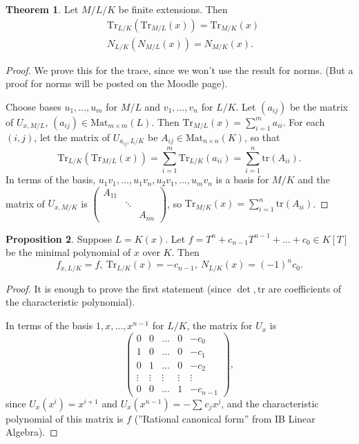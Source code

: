 \documentclass{article}
\theoremstyle{definition}
\newtheorem{theorem}{Theorem}[section]
\newtheorem{prop}[theorem]{Proposition}
\begin{document}
\begin{theorem}\label{13.2}
    Let $M/L/K$ be finite extensions. Then 
    \begin{align*}
        &\text{Tr}_{L/K}(\text{Tr}_{M/L}(x)) = \text{Tr}_{M/K}(x) \\
        &N_{L/K}(N_{M/L}(x)) = N_{M/K}(x).
    \end{align*}
\end{theorem}
\begin{proof}
    We prove this for the trace, since we won't use the result for norms. (But a proof for norms will be posted on the Moodle page).
    \vspace{1mm}
    
    Choose bases $u_1,\ldots,u_m$ for $M/L$ and $v_1,\ldots, v_n$ for $L/K$. Let $(a_{ij})$ be the matrix of $U_{x,M/L}$, $(a_{ij}) \in \text{Mat}_{m \times m}(L)$. Then $\text{Tr}_{M/L}(x)=\sum_{i=1}^{m} a_{ii}$. For each $(i,j)$, let the matrix of $U_{a_{ij},L/K}$ be $A_{ij} \in \text{Mat}_{n \times n}(K)$, so that $$\text{Tr}_{L/K}(\text{Tr}_{M/L}(x)) = \sum_{i=1}^{m} \text{Tr}_{L/K}(a_{ii}) = \sum_{i=1}^{n} \text{tr}(A_{ii}).$$
    In terms of the basis, $u_1v_1,\ldots,u_1v_n,u_2v_1,\ldots,u_mv_n$ is a basis for $M/K$ and the matrix of $U_{x,M/K}$ is $\begin{pmatrix} A_{11} & &\\ & \ddots & \\ & & A_{nn} \end{pmatrix}$, so $\text{Tr}_{M/K}(x)=\sum_{i=1}^{n} \text{tr}(A_{ii})$.
\end{proof}
\begin{prop}\label{13.3}
    Suppose $L=K(x)$. Let ${f = T^n + c_{n-1}T^{n-1} + \ldots + c_0 \in K[T]}$ be the minimal polynomial of $x$ over $K$. Then \[
    f_{x,L/K}=f,~ \text{Tr}_{L/K}(x)=-c_{n-1},~ N_{L/K}(x)=(-1)^nc_0.
    \]
\end{prop}
\begin{proof}
    It is enough to prove the first statement (since $\det, \text{tr}$ are coefficients of the characteristic polynomial).

    In terms of the basis $1,x,\ldots,x^{n-1}$ for $L/K$, the matrix for $U_x$ is \[
    \begin{pmatrix}
    0 & 0 & \ldots & 0 &-c_0\\
    1 & 0 & \ldots & 0 &-c_1\\
    0 & 1 & \ldots & 0 & -c_2 \\
    \vdots & \vdots & \vdots & \vdots & \vdots \\
    0 & 0 & \ldots & 1 & -c_{n-1} 
    \end{pmatrix},
    \]
    since $U_x(x^i) = x^{i+1}$ and $U_x(x^{n-1})=- \sum_{}^{} c_jx^j$, and the characteristic polynomial of this matrix is $f$ (''Rational canonical form'' from IB Linear Algebra).
\end{proof}
\end{document}
